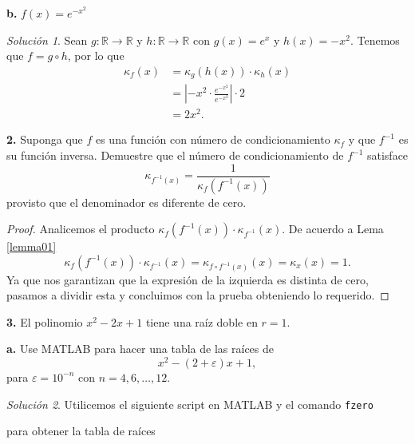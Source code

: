 \documentclass{article}
\newenvironment{statement}[1]{\smallskip\noindent\color[rgb]{1.00,0.00,0.50} {\bf #1.}}{}
\theoremstyle{definition}
\theoremstyle{remark}
\newtheorem*{solution}{Soluci\'on}
\newcommand{\BR}{\mathbb R}
\begin{document}
\begin{statement}{b}
  $f(x) = e^{-x^2}$
\end{statement}

\begin{solution}
  Sean $g: \BR \to \BR$ y $h: \BR \to \BR$ con $g(x) = e^x$ y $h(x) = -x^2$.
  Tenemos que $f = g \circ h$, por lo que
  \begin{align*}
    \kappa_f(x) &= \kappa_g(h(x)) \cdot \kappa_h(x) \\
    &= \left|-x^2 \cdot \frac{e^{-x^2}}{e^{-x^2}}\right|\cdot 2 \\
    &= 2x^2.
  \end{align*}
\end{solution}

\begin{statement}{2}
  Suponga que $f$ es una funci\'on con n\'umero de condicionamiento
  $\kappa_f$ y que $f^{-1}$ es su funci\'on inversa. Demuestre que el n\'umero
  de condicionamiento de $f^{-1}$ satisface
  \[
    \kappa_{f^{-1}(x)} = \frac{1}{\kappa_f(f^{-1}(x))}
  \]
  provisto que el denominador es diferente de cero.
\end{statement}

\begin{proof}
  Analicemos el producto $\kappa_f(f^{-1}(x)) \cdot \kappa_{f^{-1}}(x)$.
  De acuerdo a Lema \ref{lemma01}
  \[
    \kappa_f(f^{-1}(x)) \cdot \kappa_{f^{-1}}(x) = \kappa_{f \circ f^{-1}(x)}(x) = \kappa_x(x) = 1.
  \]
  Ya que nos garantizan que la expresi\'on de la izquierda es distinta de cero,
  pasamos a dividir esta y concluimos con la prueba obteniendo lo requerido.
\end{proof}

\begin{statement}{3}
  El polinomio $x^2 - 2x + 1$ tiene una ra\'iz doble en $r = 1$.
\end{statement}

\begin{statement}{a}
  Use MATLAB para hacer una tabla de las ra\'ices de
  \[
    x^2 - (2 + \varepsilon)x + 1,  
  \]
  para $\varepsilon = 10^{-n}$ con $n = 4, 6, \dots, 12$.
\end{statement}

\begin{solution}
  Utilicemos el siguiente script en MATLAB y el comando \texttt{fzero}
  
  para obtener la tabla de ra\'ices
  
\end{solution}
\end{document}
